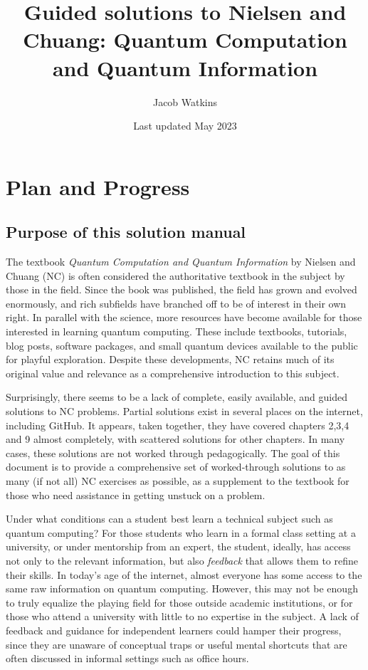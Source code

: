 \documentclass{book}
\title{Guided solutions to Nielsen and Chuang: Quantum Computation and Quantum Information}
\author{Jacob Watkins}
\date{Last updated May 2023}
\begin{document}
\maketitle

\setcounter{chapter}{-1}
\chapter{Plan and Progress}
\section{Purpose of this solution manual}
The textbook \emph{Quantum Computation and Quantum Information} by Nielsen and Chuang (NC) is often considered the authoritative textbook in the subject by those in the field. Since the book was published, the field has grown and evolved enormously, and rich subfields have branched off to be of interest in their own right. In parallel with the science, more resources have become available for those interested in learning quantum computing. These include textbooks, tutorials, blog posts, software packages, and small quantum devices available to the public for playful exploration. Despite these developments, NC retains much of its original value and relevance as a comprehensive introduction to this subject.

Surprisingly, there seems to be a lack of complete, easily available, and guided solutions to NC problems. Partial solutions exist in several places on the internet, including GitHub. It appears, taken together, they have covered chapters 2,3,4 and 9 almost completely, with scattered solutions for other chapters. In many cases, these solutions are not worked through pedagogically. The goal of this document is to provide a comprehensive set of worked-through solutions to as many (if not all) NC exercises as possible, as a supplement to the textbook for those who need assistance in getting unstuck on a problem.

Under what conditions can a student best learn a technical subject such as quantum computing? For those students who learn in a formal class setting at a university, or under mentorship from an expert, the student, ideally, has access not only to the relevant information, but also \emph{feedback} that allows them to refine their skills. In today's age of the internet, almost everyone has some access to the same raw information on quantum computing. However, this may not be enough to truly equalize the playing field for those outside academic institutions, or for those who attend a university with little to no expertise in the subject. A lack of feedback and guidance for independent learners could hamper their progress, since they are unaware of conceptual traps or useful mental shortcuts that are often discussed in informal settings such as office hours.
\end{document}
